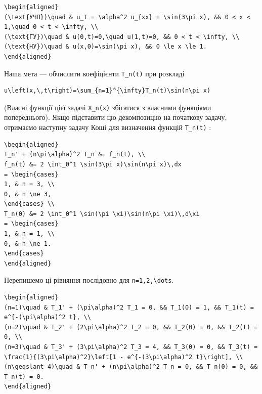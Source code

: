 \documentclass[
  ukrainian,
]{article}
\begin{document}
\begin{verbatim}
\begin{aligned}
(\text{УЧП})\quad & u_t = \alpha^2 u_{xx} + \sin(3\pi x), && 0 < x < 1,\quad 0 < t < \infty, \\
(\text{ГУ})\quad & u(0,t)=0,\quad u(1,t)=0, && 0 < t < \infty, \\
(\text{НУ})\quad & u(x,0)=\sin(\pi x), && 0 \le x \le 1.
\end{aligned}
\end{verbatim}

Наша мета --- обчислити коефіцієнти \texttt{T\_n(t)} при розкладі

\begin{verbatim}
u\left(x,\,t\right)=\sum_{n=1}^{\infty}T_n(t)\sin(n\pi x)
\end{verbatim}

(Власні функції цієї задачі \texttt{X\_n(x)} збігатися з власними
функціями попереднього). Якщо підставити цю декомпозицію на початкову
задачу, отримаємо наступну задачу Коші для визначення функцій
\texttt{T\_n(t)} :

\begin{verbatim}
\begin{aligned}
T_n' + (n\pi\alpha)^2 T_n &= f_n(t), \\
f_n(t) &= 2 \int_0^1 \sin(3\pi x)\sin(n\pi x)\,dx
= \begin{cases}
1, & n = 3, \\
0, & n \ne 3,
\end{cases} \\
T_n(0) &= 2 \int_0^1 \sin(\pi \xi)\sin(n\pi \xi)\,d\xi
= \begin{cases}
1, & n = 1, \\
0, & n \ne 1.
\end{cases}
\end{aligned}
\end{verbatim}

Перепишемо ці рівняння послідовно для
\texttt{n=1,2,\textbackslash{}dots}.

\begin{verbatim}
\begin{aligned}
(n=1)\quad & T_1' + (\pi\alpha)^2 T_1 = 0, && T_1(0) = 1, && T_1(t) = e^{-(\pi\alpha)^2 t}, \\
(n=2)\quad & T_2' + (2\pi\alpha)^2 T_2 = 0, && T_2(0) = 0, && T_2(t) = 0, \\
(n=3)\quad & T_3' + (3\pi\alpha)^2 T_3 = 4, && T_3(0) = 0, && T_3(t) = \frac{1}{(3\pi\alpha)^2}\left[1 - e^{-(3\pi\alpha)^2 t}\right], \\
(n\geqslant 4)\quad & T_n' + (n\pi\alpha)^2 T_n = 0, && T_n(0) = 0, && T_n(t) = 0.
\end{aligned}
\end{verbatim}
\end{document}

